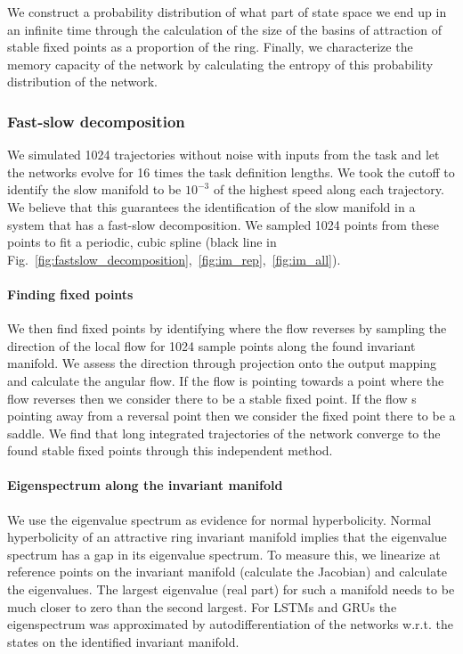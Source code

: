\documentclass{article} %
\newcounter{ct}
\theoremstyle{definition}
\theoremstyle{remark}
\begin{document}
We construct a probability distribution of what part of state space we end up in an infinite time through the calculation of the size of the basins of attraction of stable fixed points as a proportion of the ring.
Finally, we characterize the memory capacity of the network by calculating the entropy of this probability distribution of the network.


 \subsubsection{Fast-slow decomposition}\label{sec:fsdecmethod}
 We simulated 1024 trajectories without noise with inputs from the task and let the networks evolve for 16 times the task definition lengths.
 We took the cutoff to identify the slow manifold to be \(10^{-3}\) of the highest speed along each trajectory.
 We believe that this guarantees the identification of the slow manifold in a system that has a fast-slow decomposition.
 We sampled 1024 points from these points to fit a periodic, cubic spline (black line in Fig.~\ref{fig:fastslow_decomposition},~\ref{fig:im_rep},~\ref{fig:im_all}).



\paragraph{Finding fixed points}\label{sec:supp:fpf}
 We then find fixed points by identifying where the flow reverses by sampling the direction of the local flow for 1024 sample points along the found invariant manifold.
 We assess the direction through projection onto the output mapping and calculate the angular flow.
If the flow is pointing towards a point where the flow reverses then we consider there to be a stable fixed point.
If the flow s pointing away from a reversal point then we consider the fixed point there to be a saddle.
We find that long integrated trajectories of the network converge to the found stable fixed points through this independent method.


\paragraph{Eigenspectrum along the invariant manifold}
We use the eigenvalue spectrum as evidence for normal hyperbolicity.
Normal hyperbolicity of an attractive ring invariant manifold implies that the eigenvalue spectrum has a gap in its eigenvalue spectrum.
To measure this, we linearize at reference points on the invariant manifold (calculate the Jacobian) and calculate the eigenvalues.
The largest  eigenvalue (real part) for such a manifold needs to be much closer to zero than the second largest.
For LSTMs and GRUs the  eigenspectrum was approximated by autodifferentiation of the networks w.r.t. the states on the identified invariant manifold.
\end{document}
